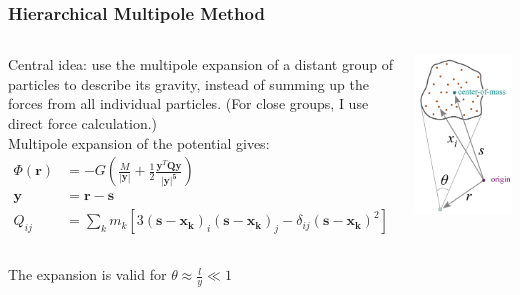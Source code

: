 
\begin{frame}
	\frametitle{Hierarchical Multipole Method}
	\begin{columns}
			Central idea: use the multipole expansion of a distant group of particles to describe its gravity, instead of summing up the forces from all individual particles.			
			(For close groups, I use direct force calculation.)\\[1em]
			
			Multipole expansion of the potential gives:
			\begin{align*}
				\Phi(\mathbf{r}) &= -G \left( \frac{M}{|\mathbf{y}|} + \frac{1}{2} \frac{\mathbf{y}^T\mathbf{Q}\mathbf{y} }{\mathbf{|y|^5}} \right)\\
				\mathbf{y} &= \mathbf{r} - \mathbf{s}\\
				Q_{ij} &= \sum_k m_k [3(\mathbf{s} - \mathbf{x_k})_i(\mathbf{s} - \mathbf{x_k})_j - \delta_{ij} (\mathbf{s} - \mathbf{x_k})^2]
			\end{align*}
			
			\centering
			\includegraphics[width=\textwidth]{images/multipole.png} 
	\end{columns}

	The expansion is valid for $\theta \approx \frac{l}{y} \ll 1$
\end{frame}
